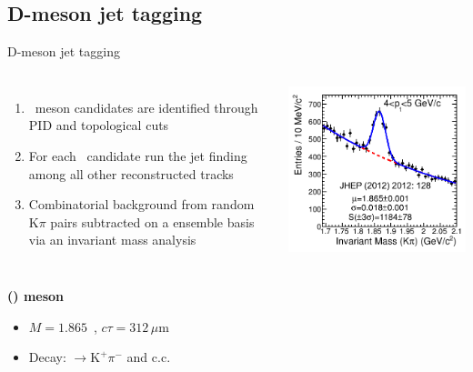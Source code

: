 \documentclass{beamer}
\begin{document}
\subsection{D-meson jet tagging}
\begin{frame}{D-meson jet tagging}

\begin{columns}

\begin{enumerate}
\item \Dzero\ meson candidates are identified through \alert{PID} and \alert{topological} cuts
\item For each \Dzero\ candidate run the \alert{jet finding} among all other reconstructed tracks
\item Combinatorial background from random $\mathrm{K}\pi$ pairs subtracted on a ensemble basis via an \alert{invariant mass analysis}
\end{enumerate}

\includegraphics[width=\textwidth]{img/ALICE_D0InvMass}
\end{columns}
\bigskip
\textbf{\alert{\Dzero(\Dzerobar) meson}}
\begin{itemize}
\item $M=1.865$~\GeVcsq, $c\tau=312\,\mu\mathrm{m}$ 
\item Decay: \Dzero$\rightarrow\mathrm{K}^+\pi^-$ and c.c.
\end{itemize}

\end{frame}
\end{document}
